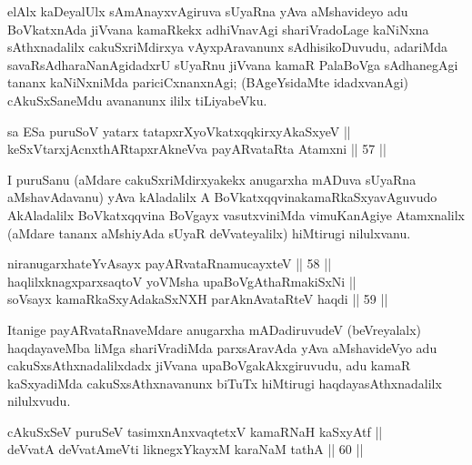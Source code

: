 \begin{artha}
elAlx kaDeyalUlx sAmAnayxvAgiruva sUyaRna yAva aMshavideyo
adu BoVkatxnAda jiVvana kamaRkekx adhiVnavAgi shariVradoLage kaNiNxna
sAthxnadalilx cakuSxriMdirxya vAyxpAravanunx sAdhisikoDuvudu, adariMda
savaRsAdharaNanAgidadxrU sUyaRnu jiVvana kamaR PalaBoVga sAdhanegAgi
tananx kaNiNxniMda pariciCxnanxnAgi; (BAgeYsidaMte idadxvanAgi)
cAkuSxSaneMdu avananunx ililx tiLiyabeVku.
\end{artha}


\begin{shl}
sa ESa puruSoV yatarx tatapxrXyoVkatxqqkirxyAkaSxyeV || \\
keSxVtarxjAcnxthARtapxrAkneVva payARvataRta Atamxni \hfill || 57 ||  
\end{shl}

\begin{artha}
I puruSanu (aMdare cakuSxriMdirxyakekx anugarxha mADuva sUyaRna aMshavAdavanu)
yAva kAladalilx A BoVkatxqqvina\break kamaRkaSxyavAguvudo
AkAladalilx BoVkatxqqvina BoVgayx vasutxviniMda vimuKanAgiye
Atamxnalilx (aMdare tananx aMshiyAda sUyaR deVvateyalilx) hiMtirugi
nilulxvanu.
\end{artha}


\begin{shl}
niranugarxhateYvAsayx payARvataRnamucayxteV \hfill || 58 ||  \\
haqlilxknagxparxsaqtoV yoVM\s sha upaBoVgAthaRmakiSxNi || \\
soV\s sayx kamaRkaSxyAdakaSxNXH parAknAvataRteV haqdi \hfill || 59 ||  
\end{shl}

\begin{artha}
Itanige payARvataRnaveMdare anugarxha mADadiruvudeV (beVreyalalx)
haqdayaveMba liMga shariVradiMda parxsAravAda yAva aMshavideVyo adu
cakuSxsAthxnadalilxdadx jiVvana upaBoVgakAkxgiruvudu, adu kamaR kaSxyadiMda
cakuSxsAthxnavanunx biTuTx hiMtirugi haqdayasAthxnadalilx nilulxvudu.
\end{artha}


\begin{shl}
cAkuSxSeV puruSeV tasimxnAnxvaqtetxV kamaRNaH kaSxyAtf || \\
deVvatA deVvatAmeVti liknegxYkayxM karaNaM tathA \hfill || 60 ||  
\end{shl}

